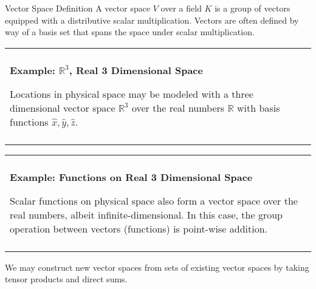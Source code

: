 \documentclass[11pt]{beamer}
\newenvironment{boxed2}
    {\begin{center}
    \begin{tabular}{|p{0.95\textwidth}|}
    \hline\\
    }
    { 
    \\\\\hline
    \end{tabular} 
    \end{center}
    }
\begin{document}
\begin{frame}{Vector Space Definition}
	A vector space $V$ over a field $K$ is a group of vectors equipped with a distributive scalar multiplication. Vectors are often defined by way of a basis set that spans the space under scalar multiplication.
	

	\begin{boxed2}
		
		\vspace{-.61cm}
		
		\textbf{Example: $\mathbb{R}^3$, Real 3 Dimensional Space} 
		
		Locations in physical space may be modeled with a three dimensional vector space  $\mathbb{R}^3$ over the real numbers $\mathbb{R}$ with basis functions $\hat{x},\hat{y},\hat{z}$.
		
		\vspace{-.3cm}
		
	\end{boxed2}	
	
	
		\begin{boxed2}
		
		\vspace{-.61cm}
		
		\textbf{Example: Functions on Real 3 Dimensional Space} 
		
		Scalar functions on physical space also form a vector space over the real numbers, albeit infinite-dimensional. In this case, the group operation between vectors (functions) is point-wise addition.
		
		\vspace{-.3cm}
		
	\end{boxed2}	
	
We may construct new vector spaces from sets of existing vector spaces by taking tensor products and direct sums.

\end{frame}



\end{document}
